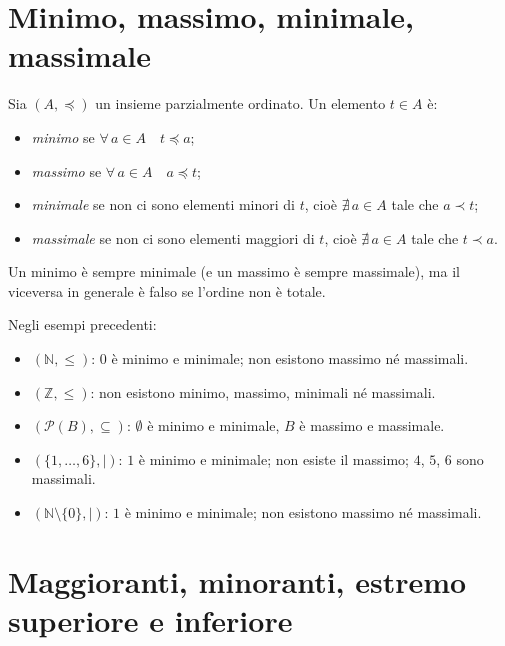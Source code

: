 \documentclass[11pt,a4paper]{article}
\begin{document}
\section{Minimo, massimo, minimale, massimale}

\begin{definizione}
Sia $(A, \preceq)$ un insieme parzialmente ordinato. Un elemento $t \in A$ è:
\begin{itemize}
    \item \emph{minimo} se $\forall\, a \in A \quad t \preceq a$;
    \item \emph{massimo} se $\forall\, a \in A \quad a \preceq t$;
    \item \emph{minimale} se non ci sono elementi minori di $t$, cioè
          $\nexists\, a \in A$ tale che $a \prec t$;
    \item \emph{massimale} se non ci sono elementi maggiori di $t$, cioè
          $\nexists\, a \in A$ tale che $t \prec a$.
\end{itemize}
\end{definizione}

Un minimo è sempre minimale (e un massimo è sempre massimale), ma il
viceversa in generale è falso se l'ordine non è totale.

\begin{esempio}
Negli esempi precedenti:
\begin{itemize}
    \item $(\mathbb{N}, \leq)$: $0$ è minimo e minimale; non esistono
          massimo né massimali.
    \item $(\mathbb{Z}, \leq)$: non esistono minimo, massimo, minimali né
          massimali.
    \item $(\mathcal{P}(B), \subseteq)$: $\emptyset$ è minimo e minimale,
          $B$ è massimo e massimale.
    \item $(\{1, \dots, 6\}, \mid)$: $1$ è minimo e minimale; non esiste
          il massimo; $4$, $5$, $6$ sono massimali.
    \item $(\mathbb{N} \setminus \{0\}, \mid)$: $1$ è minimo e minimale;
          non esistono massimo né massimali.
\end{itemize}
\end{esempio}

\section{Maggioranti, minoranti, estremo superiore e inferiore}
\end{document}
